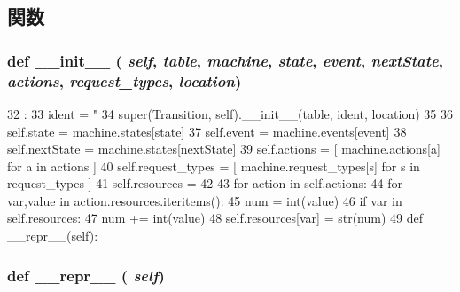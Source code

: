 \subsection{関数}
\hypertarget{classslicc_1_1symbols_1_1Transition_1_1Transition_ac775ee34451fdfa742b318538164070e}{
\subsubsection[{\_\-\_\-init\_\-\_\-}]{\setlength{\rightskip}{0pt plus 5cm}def \_\-\_\-init\_\-\_\- ( {\em self}, \/   {\em table}, \/   {\em machine}, \/   {\em state}, \/   {\em event}, \/   {\em nextState}, \/   {\em actions}, \/   {\em request\_\-types}, \/   {\em location})}}
\label{classslicc_1_1symbols_1_1Transition_1_1Transition_ac775ee34451fdfa742b318538164070e}



\begin{DoxyCode}
32                                          :
33         ident = "%
34         super(Transition, self).__init__(table, ident, location)
35 
36         self.state = machine.states[state]
37         self.event = machine.events[event]
38         self.nextState = machine.states[nextState]
39         self.actions = [ machine.actions[a] for a in actions ]
40         self.request_types = [ machine.request_types[s] for s in request_types ]
41         self.resources = {}
42 
43         for action in self.actions:
44             for var,value in action.resources.iteritems():
45                 num = int(value)
46                 if var in self.resources:
47                     num += int(value)
48                 self.resources[var] = str(num)
49 
    def __repr__(self):
\end{DoxyCode}
\hypertarget{classslicc_1_1symbols_1_1Transition_1_1Transition_ad8b9328939df072e4740cd9a63189744}{
\subsubsection[{\_\-\_\-repr\_\-\_\-}]{\setlength{\rightskip}{0pt plus 5cm}def \_\-\_\-repr\_\-\_\- ( {\em self})}}
\label{classslicc_1_1symbols_1_1Transition_1_1Transition_ad8b9328939df072e4740cd9a63189744}


